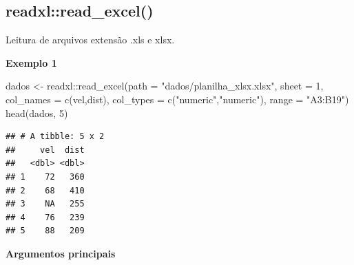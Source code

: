 \documentclass[
]{book}
\newenvironment{Shaded}{\begin{snugshade}}{\end{snugshade}}
\newcommand{\AttributeTok}[1]{\textcolor[rgb]{0.77,0.63,0.00}{#1}}
\newcommand{\DecValTok}[1]{\textcolor[rgb]{0.00,0.00,0.81}{#1}}
\newcommand{\FunctionTok}[1]{\textcolor[rgb]{0.00,0.00,0.00}{#1}}
\newcommand{\NormalTok}[1]{#1}
\newcommand{\OtherTok}[1]{\textcolor[rgb]{0.56,0.35,0.01}{#1}}
\newcommand{\SpecialCharTok}[1]{\textcolor[rgb]{0.00,0.00,0.00}{#1}}
\newcommand{\StringTok}[1]{\textcolor[rgb]{0.31,0.60,0.02}{#1}}
\theoremstyle{definition}
\theoremstyle{definition}
\theoremstyle{definition}
\theoremstyle{definition}
\theoremstyle{remark}
\begin{document}
\hypertarget{readxlread_excel}{%
\subsection{readxl::read\_excel()}\label{readxlread_excel}}

Leitura de arquivos extensão .xls e xlsx.

\textbf{Exemplo 1}

\begin{Shaded}
\begin{Highlighting}[]
\NormalTok{   dados }\OtherTok{\textless{}{-}}\NormalTok{ readxl}\SpecialCharTok{::}\FunctionTok{read\_excel}\NormalTok{(}\AttributeTok{path =} \StringTok{"dados/planilha\_xlsx.xlsx"}\NormalTok{,}
                   \AttributeTok{sheet =} \DecValTok{1}\NormalTok{,}
                   \AttributeTok{col\_names =} \FunctionTok{c}\NormalTok{(}\StringTok{\textquotesingle{}vel\textquotesingle{}}\NormalTok{,}\StringTok{\textquotesingle{}dist\textquotesingle{}}\NormalTok{),}
                   \AttributeTok{col\_types =} \FunctionTok{c}\NormalTok{(}\StringTok{"numeric"}\NormalTok{,}\StringTok{"numeric"}\NormalTok{),}
                   \AttributeTok{range =} \StringTok{"A3:B19"}\NormalTok{)}
    \FunctionTok{head}\NormalTok{(dados, }\DecValTok{5}\NormalTok{)}
\end{Highlighting}
\end{Shaded}

\begin{verbatim}
## # A tibble: 5 x 2
##     vel  dist
##   <dbl> <dbl>
## 1    72   360
## 2    68   410
## 3    NA   255
## 4    76   239
## 5    88   209
\end{verbatim}

\textbf{Argumentos principais}
\end{document}
